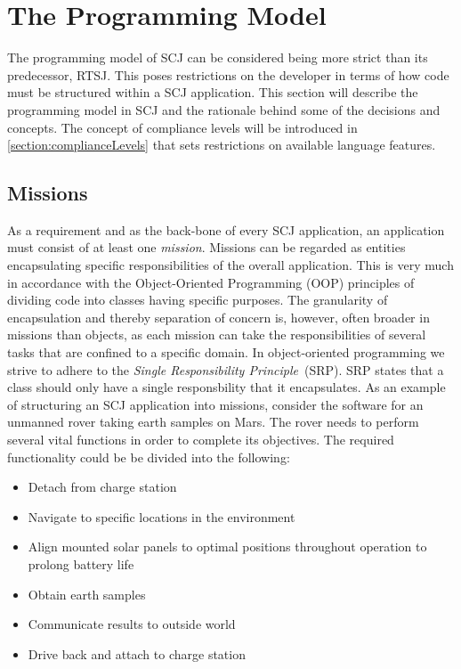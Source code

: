 \section{The Programming Model}
\label{section:programmingmodel}
The programming model of SCJ can be considered being more strict than its predecessor, RTSJ. This poses restrictions on the developer in terms of how code must be structured within a SCJ application.
This section will describe the programming model in SCJ and the rationale behind some of the decisions and concepts. The concept of compliance levels will be introduced in \ref{section:complianceLevels} that sets restrictions on available language features.

\subsection{Missions}
As a requirement and as the back-bone of every SCJ application, an application must consist of at least one \textit{mission}. Missions can be regarded as entities encapsulating specific responsibilities of the overall application. This is very much in accordance with the Object-Oriented Programming (OOP) principles of dividing code into classes having specific purposes. The granularity of encapsulation and thereby separation of concern is, however, often broader in missions than objects, as each mission can take the responsibilities of several tasks that are confined to a specific domain. In object-oriented programming we strive to adhere to the \textit{Single Responsibility Principle}~(SRP). SRP states that a class should only have a single responsbility that it encapsulates\cite{Martin:2008:CCH:1388398}. As an example of structuring an SCJ application into missions, consider the software for an unmanned rover taking earth samples on Mars. The rover needs to perform several vital functions in order to complete its objectives. The required functionality could be be divided into the following:

\begin{itemize}
	\item Detach from charge station
	\item Navigate to specific locations in the environment
	\item Align mounted solar panels to optimal positions throughout operation to prolong battery life
	\item Obtain earth samples
	\item Communicate results to outside world
	\item Drive back and attach to charge station
\end{itemize}

